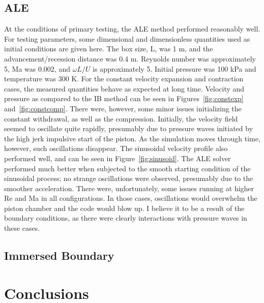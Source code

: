\documentclass{article}
\begin{document}
\subsection{ALE}

At the conditions of primary testing, the ALE method performed reasonably well.  For testing parameters, some dimensional and dimensionless quantities used as initial conditions are given here.  The box size, L, was 1 m, and the advancement/recession distance was 0.4 m.  Reynolds number was approximately 5, Ma was 0.002, and $\omega L/U$ is approximately 5.  Initial pressure was 100 kPa and temperature was 300 K.  For the constant velocity expansion and contraction cases, the measured quantities behave as expected at long time.  Velocity and pressure as compared to the IB method can be seen in Figures~\ref{fig:constexp} and~\ref{fig:constcomp}.  There were, however, some minor issues initializing the constant withdrawal, as well as the compression.  Initially, the velocity field seemed to oscillate quite rapidly, presumably due to pressure waves initiated by the high jerk impulsive start of the piston.  As the simulation moves through time, however, such oscillations disappear.  The sinusoidal velocity profile also performed well, and can be seen in Figure~\ref{fig:sinusoid}.  The ALE solver performed much better when subjected to the smooth starting condition of the sinusoidal process; no strange oscillations were observed, presumably due to the smoother acceleration.  There were, unfortunately, some issues running at higher Re and Ma in all configurations. In those cases, oscillations would overwhelm the piston chamber and the code would blow up.  I believe it to be a result of the boundary conditions, as there were clearly interactions with pressure waves in these cases.  

\subsection{Immersed Boundary}





\section{Conclusions}
\end{document}
